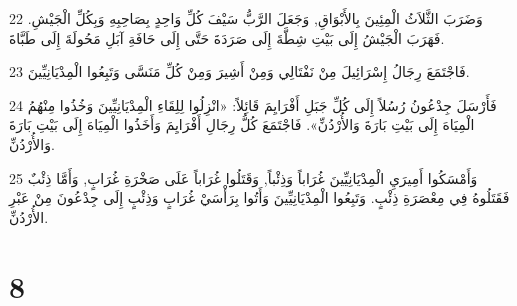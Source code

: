 \par 22 وَضَرَبَ الثَّلاَثُ الْمِئِينَ بِالأَبْوَاقِ, وَجَعَلَ الرَّبُّ سَيْفَ كُلِّ وَاحِدٍ بِصَاحِبِهِ وَبِكُلِّ الْجَيْشِ. فَهَرَبَ الْجَيْشُ إِلَى بَيْتِ شِطَّةَ إِلَى صَرَدَةَ حَتَّى إِلَى حَافَةِ آبَلِ مَحُولَةَ إِلَى طَبَّاةَ.
\par 23 فَاجْتَمَعَ رِجَالُ إِسْرَائِيلَ مِنْ نَفْتَالِي وَمِنْ أَشِيرَ وَمِنْ كُلِّ مَنَسَّى وَتَبِعُوا الْمِدْيَانِيِّينَ.
\par 24 فَأَرْسَلَ جِدْعُونُ رُسُلاً إِلَى كُلِّ جَبَلِ أَفْرَايِمَ قَائِلاً: «انْزِلُوا لِلِقَاءِ الْمِدْيَانِيِّينَ وَخُذُوا مِنْهُمُ الْمِيَاهَ إِلَى بَيْتِ بَارَةَ وَالأُرْدُنِّ». فَاجْتَمَعَ كُلُّ رِجَالِ أَفْرَايِمَ وَأَخَذُوا الْمِيَاهَ إِلَى بَيْتِ بَارَةَ وَالأُرْدُنِّ.
\par 25 وَأَمْسَكُوا أَمِيرَيِ الْمِدْيَانِيِّينَ غُرَاباً وَذِئْباً, وَقَتَلُوا غُرَاباً عَلَى صَخْرَةِ غُرَابٍ, وَأَمَّا ذِئْبٌ فَقَتَلُوهُ فِي مِعْصَرَةِ ذِئْبٍ. وَتَبِعُوا الْمِدْيَانِيِّينَ وَأَتُوا بِرَأْسَيْ غُرَابٍ وَذِئْبٍ إِلَى جِدْعُونَ مِنْ عَبْرِ الأُرْدُنِّ.

\chapter{8}

